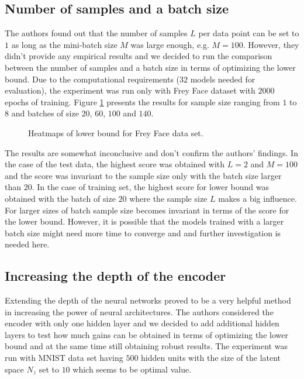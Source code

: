 \documentclass[../report.tex]{subfiles}
\begin{document}
\subsection{Number of samples and a batch size}
The authors found out that the number of samples $L$ per data point can be set to $1$ as long as the mini-batch size $M$ was large enough, e.g. $M = 100$. However, they didn't provide any empirical results and we decided to run the comparison between the number of samples and a batch size in terms of optimizing the lower bound. Due to the computational requirements ($32$ models needed for evaluation), the experiment was run only with Frey Face dataset with $2000$ epochs of training. Figure \ref{fig:heatmaps} presents the results for sample size ranging from $1$ to $8$ and batches of size $20$, $60$, $100$ and $140$.
\begin{figure}[!htb]
%
\endminipage 
{}  
\endminipage\hfill
  \caption[1]{Heatmaps of lower bound for Frey Face data set.}
  \label{fig:heatmaps}
\end{figure}

The results are somewhat inconclusive and don't confirm the authors' findings. In the case of the test data, the highest score was obtained with $L=2$ and $M=100$ and the score was invariant to the sample size only with the batch size larger than $20$. In the case of training set, the highest score for lower bound was obtained with the batch of size $20$ where the sample size $L$ makes a big influence. For larger sizes of batch sample size becomes invariant in terms of the score for the lower bound. However, it is possible that the models trained with a larger batch size might need more time to converge and and further investigation is needed here.

\subsection{Increasing the depth of the encoder}
Extending the depth of the neural networks proved to be a very helpful method in increasing the power of neural architectures. The authors considered the encoder with only one hidden layer and we decided to add additional hidden layers to test how much gains can be obtained in terms of optimizing the lower bound and at the same time still obtaining robust results. The experiment was run with MNIST data set having $500$ hidden units with the size of the latent space $N_z$ set to $10$ which seems to be optimal value. 
\end{document}
